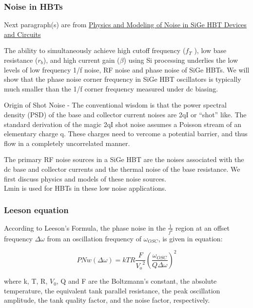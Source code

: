 \subsubsection*{Noise in HBTs}

Next paragraph(s) are from \href{https://briefs.techconnect.org/wp-content/volumes/Nanotech2005WCM/pdf/1244.pdf}{Physics and Modeling of Noise in SiGe HBT Devices and Circuits}

The ability to simultaneously achieve high cutoff frequency ($f_T$ ), low base resistance ($r_b$), and high current gain ($\beta$) using Si processing underlies the low levels of low frequency 1/f noise, RF noise and phase noise of SiGe HBTs. We will show that the phase noise corner frequency in SiGe HBT oscillators is typically much smaller than the 1/f corner frequency measured under dc biasing.

Origin of Shot Noise - The conventional wisdom is that the power spectral density (PSD) of the base and collector current noises are 2qI or “shot” like. The standard derivation of the magic 2qI shot noise assumes a Poisson stream of an elementary charge q. These charges need to  vercome a potential barrier, and thus flow in a completely uncorrelated manner.

The primary RF noise sources in a SiGe HBT are the noises associated with the dc base and collector currents and the thermal noise of the base resistance. We first discuss physics and models of these noise sources. \\

Lmin is used for HBTs in these low noise applications. 


\subsubsection*{Leeson equation}

According to Leeson's Formula, the phase noise in the $\frac{1}{f^2}$ region at an offset frequency $\Delta \omega$ from an oscillation frequency of $\omega_{OSC}$, is given in equation:

\begin{equation}
	PNw(\Delta \omega) = kTR \dfrac{F}{{V_o}^2} {(\dfrac{\omega_{OSC}}{Q \Delta \omega})}^2
\end{equation}

where k, T, R, $V_0$, Q and F are the Boltzmann's constant, the absolute temperature, the equivalent tank parallel resistance, the peak oscillation amplitude, the tank quality factor, and the noise factor, respectively.

